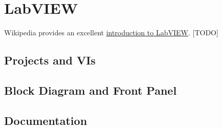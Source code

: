 
\section{LabVIEW}
\label{sec:eq_labview}

Wikipedia provides an excellent \href{http://en.wikipedia.org/wiki/LabVIEW}{introduction to LabVIEW}. [TODO]

\subsection{Projects and VIs}
\label{sec:eq_labview:projects_vis}

\subsection{Block Diagram and Front Panel}
\label{sec:eq_labview:block_diagram}

\subsection{Documentation}
\label{sec:eq_labview:docs}



